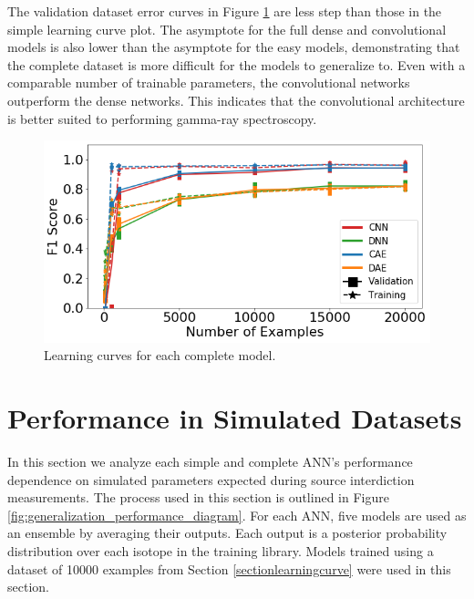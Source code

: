 The validation dataset error curves in Figure \ref{fig:learning_curves_full} are less step than those in the simple learning curve plot. The asymptote for the full dense and convolutional models is also lower than the asymptote for the easy models, demonstrating that the complete dataset is more difficult for the models to generalize to. Even with a comparable number of trainable parameters, the convolutional networks outperform the dense networks. This indicates that the convolutional architecture is better suited to performing gamma-ray spectroscopy. 

\begin{figure}[H]
	\centering
	\includegraphics[width=0.9\linewidth]{images/learning_curves_full}
	\caption{Learning curves for each complete model.}
	\label{fig:learning_curves_full}
\end{figure}



\section{Performance in Simulated Datasets} \label{simulated_dataset_performance}

In this section we analyze each simple and complete ANN's performance dependence on simulated parameters expected during source interdiction measurements. The process used in this section is outlined in Figure \ref{fig:generalization_performance_diagram}. For each ANN, five models are used as an ensemble by averaging their outputs. Each output is a posterior probability distribution over each isotope in the training library. Models trained using a dataset of 10000 examples from Section \ref{sectionlearningcurve} were used in this section.

